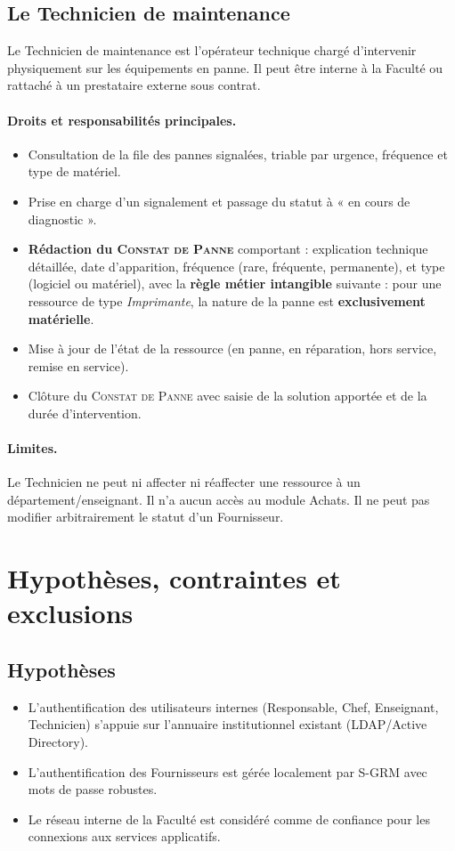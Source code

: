 \documentclass[a4paper,11pt,openany]{report}
\newcommand{\constat}{\textsc{Constat de Panne}}
\begin{document}
\subsection{Le Technicien de maintenance}

Le Technicien de maintenance est l'opérateur technique chargé
d'intervenir physiquement sur les équipements en panne. Il peut
être interne à la Faculté ou rattaché à un prestataire externe
sous contrat.

\paragraph{Droits et responsabilités principales.}
\begin{itemize}
  \item Consultation de la file des pannes signalées,
    triable par urgence, fréquence et type de matériel.
  \item Prise en charge d'un signalement et passage du statut à
    « en cours de diagnostic ».
  \item \textbf{Rédaction du \constat} comportant : explication
    technique détaillée, date d'apparition, fréquence (rare,
    fréquente, permanente), et type (logiciel ou matériel), avec
    la \textbf{règle métier intangible} suivante : pour une
    ressource de type \emph{Imprimante}, la nature de la panne
    est \textbf{exclusivement matérielle}.
  \item Mise à jour de l'état de la ressource (en panne, en
    réparation, hors service, remise en service).
  \item Clôture du \constat{} avec saisie de la solution apportée
    et de la durée d'intervention.
\end{itemize}

\paragraph{Limites.} Le Technicien ne peut ni affecter ni
réaffecter une ressource à un département/enseignant. Il n'a
aucun accès au module Achats. Il ne peut pas modifier
arbitrairement le statut d'un Fournisseur.

\section{Hypothèses, contraintes et exclusions}

\subsection{Hypothèses}
\begin{itemize}
  \item L'authentification des utilisateurs internes (Responsable,
    Chef, Enseignant, Technicien) s'appuie sur l'annuaire
    institutionnel existant (LDAP/Active Directory).
  \item L'authentification des Fournisseurs est gérée localement
    par S-GRM avec mots de passe robustes.
  \item Le réseau interne de la Faculté est considéré comme de
    confiance pour les connexions aux services applicatifs.
\end{itemize}
\end{document}
